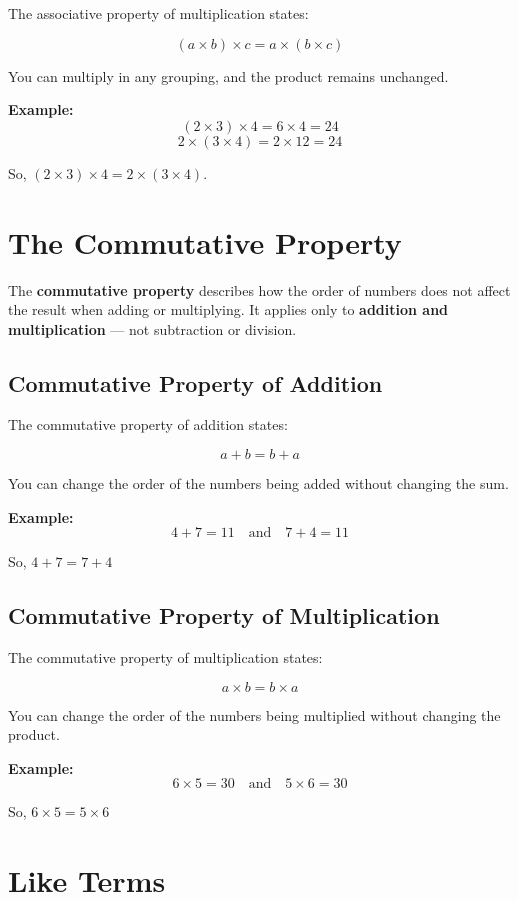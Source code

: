 \documentclass[11pt]{article}
\begin{document}
The associative property of multiplication states:

\[
(a \times b) \times c = a \times (b \times c)
\]

You can multiply in any grouping, and the product remains unchanged.

\textbf{Example:}
\[
(2 \times 3) \times 4 = 6 \times 4 = 24
\]
\[
2 \times (3 \times 4) = 2 \times 12 = 24
\]

So, \( (2 \times 3) \times 4 = 2 \times (3 \times 4) \).

\section{The Commutative Property}

The \textbf{commutative property} describes how the order of numbers does not affect the result when adding or multiplying. It applies only to \textbf{addition and multiplication} — not subtraction or division.

\subsection{Commutative Property of Addition}

The commutative property of addition states:

\[
a + b = b + a
\]

You can change the order of the numbers being added without changing the sum.

\textbf{Example:}
\[
4 + 7 = 11 \quad \text{and} \quad 7 + 4 = 11
\]

So, \( 4 + 7 = 7 + 4 \)

\subsection{Commutative Property of Multiplication}

The commutative property of multiplication states:

\[
a \times b = b \times a
\]

You can change the order of the numbers being multiplied without changing the product.

\textbf{Example:}
\[
6 \times 5 = 30 \quad \text{and} \quad 5 \times 6 = 30
\]

So, \( 6 \times 5 = 5 \times 6 \)
\section{Like Terms}
\end{document}
